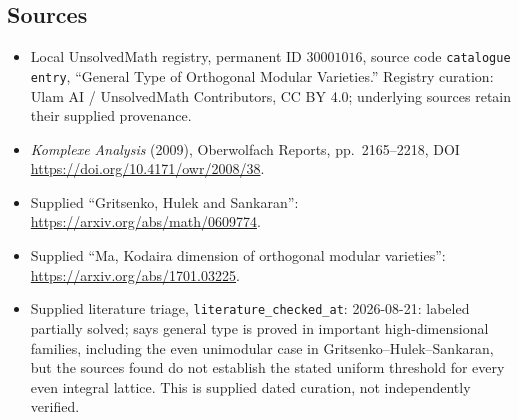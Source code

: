 \documentclass[11pt]{article}
\begin{document}
\subsection{Sources}
\begin{itemize}
\item Local UnsolvedMath registry, permanent ID \(30001016\), source code \texttt{catalogue entry}, ``General Type of Orthogonal Modular Varieties.'' Registry curation: Ulam AI / UnsolvedMath Contributors, CC BY 4.0; underlying sources retain their supplied provenance.
\item \emph{Komplexe Analysis} (2009), Oberwolfach Reports, pp.\ 2165--2218, DOI \url{https://doi.org/10.4171/owr/2008/38}.
\item Supplied ``Gritsenko, Hulek and Sankaran'': \url{https://arxiv.org/abs/math/0609774}.
\item Supplied ``Ma, Kodaira dimension of orthogonal modular varieties'': \url{https://arxiv.org/abs/1701.03225}.
\item Supplied literature triage, \texttt{literature\_checked\_at}: 2026-08-21: labeled partially solved; says general type is proved in important high-dimensional families, including the even unimodular case in Gritsenko--Hulek--Sankaran, but the sources found do not establish the stated uniform threshold for every even integral lattice. This is supplied dated curation, not independently verified.
\end{itemize}
\end{document}
